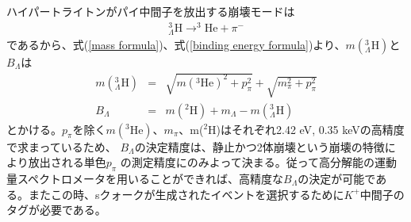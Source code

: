 \documentclass[a4paper,11pt,uplatex]{jsbook}
\begin{document}
ハイパートライトンがパイ中間子を放出する崩壊モードは
\begin{eqnarray}
  ^3_{\Lambda}\text{H} \rightarrow ^3\text{He} + \pi^-
\end{eqnarray}
であるから、式(\ref{mass formula})、式(\ref{binding energy formula})より、$m(^3_\Lambda\text{H})$と$B_\Lambda$は
\begin{eqnarray}
  m(^3_\Lambda \text{H}) &=& \sqrt{m(^3\text{He})^2 + p^2_\pi} + \sqrt{m_\pi^2 + p_\pi^2} \\
  B_\Lambda &=& m(^2\text{H}) + m_\Lambda - m(^3_\Lambda \text{H})
\end{eqnarray}
とかける。$p_\pi$を除く$m(^3\text{He})$、$m_\pi$、m($^2\text{H}$)はそれぞれ2.42 eV\cite{Audi}, 0.35 keV\cite{Beringer}の高精度で求まっているため、
$B_\Lambda$の決定精度は、静止かつ2体崩壊という崩壊の特徴により放出される単色$p_\pi$
の測定精度にのみよって決まる。従って高分解能の運動量スペクトロメータを用いることができれば、高精度な$B_\Lambda$の決定が可能である。またこの時、sクォークが生成されたイベントを選択するために$K^+$中間子のタグが必要である。
\end{document}

